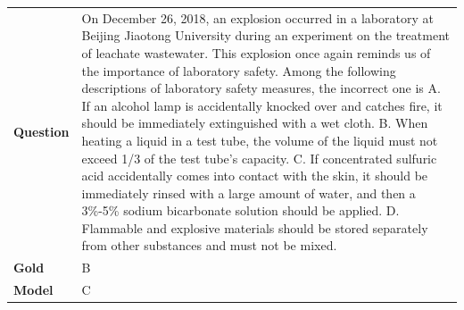 \begin{longtable}{@{}l p{13cm}@{}}
  \textbf{Question}  & On December 26, 2018, an explosion occurred in a laboratory at Beijing Jiaotong University during an experiment on the treatment of leachate wastewater. This explosion once again reminds us of the importance of laboratory safety. Among the following descriptions of laboratory safety measures, the incorrect one is \newline A. If an alcohol lamp is accidentally knocked over and catches fire, it should be immediately extinguished with a wet cloth. \newline B. When heating a liquid in a test tube, the volume of the liquid must not exceed 1/3 of the test tube's capacity. \newline C. If concentrated sulfuric acid accidentally comes into contact with the skin, it should be immediately rinsed with a large amount of water, and then a 3\%-5\% sodium bicarbonate solution should be applied. \newline D. Flammable and explosive materials should be stored separately from other substances and must not be mixed.   \\
  \textbf{Gold}      & B       \\
  \textbf{Model}     & C  \\

\end{longtable}
